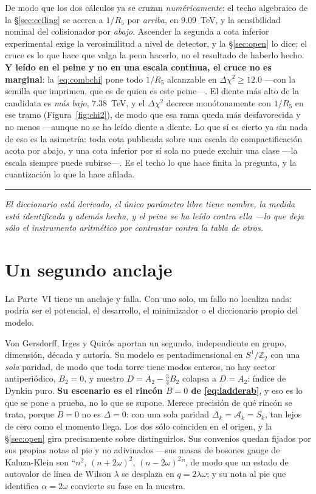 \documentclass[11pt,a4paper]{article}
\newcommand{\ZZ}{\mathbb{Z}}
\newcommand{\bridge}[1]{\par\medskip\noindent
  \textcolor{hdrblue!45}{\rule{2.2cm}{0.6pt}}\;\;\parbox[t]{0.84\textwidth}{\small\itshape
  \textcolor{hdrblue!85}{#1}}\par\medskip}
\newenvironment{keyeq}
  {\begin{center}\setlength{\fboxsep}{9pt}\setlength{\fboxrule}{0.8pt}%
   \begin{lrbox}{\keyeqbox}\begin{minipage}{0.88\textwidth}}
  {\end{minipage}\end{lrbox}%
   \fcolorbox{hdrblue!55}{hdrblue!6}{\usebox{\keyeqbox}}\end{center}}
\begin{document}
\begin{keyeq}
De modo que los dos cálculos ya se cruzan \emph{numéricamente}: el techo algebraico de la
\S\ref{sec:ceiling} se acerca a $1/R_5$ por \emph{arriba}, en $9.09$~TeV, y la sensibilidad nominal
del colisionador por \emph{abajo}. Ascender la segunda a cota inferior experimental exige la
verosimilitud a nivel de detector, y la \S\ref{sec:open} lo dice; el cruce es lo que hace que valga
la pena hacerlo, no el resultado de haberlo hecho. \textbf{Y leído en el peine y no en una escala
continua, el cruce no es marginal}: la \eqref{eq:combchi} pone todo $1/R_5$ alcanzable en
$\Delta\chi^2\ge12.0$ ---con la semilla que \cite{KM25} imprimen, que es de quien es este
peine---. El diente más alto de la candidata es \emph{más bajo}, $7.38$~TeV, y el $\Delta\chi^2$
decrece monótonamente con $1/R_5$ en ese tramo (Figura~\ref{fig:chi2}), de modo que esa rama
queda más desfavorecida y no menos ---aunque no se ha leído diente a diente. Lo que sí es cierto ya sin nada de eso es la asimetría:
toda cota publicada sobre una escala de compactificación acota por abajo, y una cota inferior por sí
sola no puede excluir una clase ---la escala siempre puede subirse---. Es el techo lo que hace
finita la pregunta, y la cuantización lo que la hace afilada.
\end{keyeq}

\bridge{El diccionario está derivado, el único parámetro libre tiene nombre, la medida está
identificada y además hecha, y el peine se ha leído contra ella ---lo que deja sólo el instrumento
aritmético por contrastar contra la tabla de otros.}

\section{Un segundo anclaje}\label{sec:anchor}

La Parte~VI tiene un anclaje y falla. Con uno solo, un fallo no localiza nada: podría ser el
potencial, el desarrollo, el minimizador o el diccionario propio del modelo.

Von Gersdorff, Irges y Quir\'os \cite{vGIQ} aportan un segundo, independiente en grupo, dimensión,
década y autoría. Su modelo es pentadimensional en $S^1/\ZZ_2$ con una \emph{sola} paridad, de modo
que toda torre tiene modos enteros, no hay sector antiperiódico, $B_2=0$, y nuestro
$D=A_2-\tfrac34B_2$ colapsa a $D=A_2$: índice de Dynkin puro. \textbf{Su escenario es el rincón
$B=0$ de \eqref{eq:ladderab}}, y eso es lo que se pone a prueba, no lo que se supone. Merece
precisión de qué rincón se trata, porque $B=0$ no es $\Delta=0$: con una sola paridad
$\Delta_k=\mathcal{A}_k=S_k$, tan lejos de cero como el momento llega. Los dos sólo coinciden en el origen, y
la \S\ref{sec:open} gira precisamente sobre distinguirlos. Sus
convenios quedan fijados por sus propias notas al pie y no adivinados ---sus masas de bosones gauge
de Kaluza-Klein son ``$n^2$, $(n+2\omega)^2$, $(n-2\omega)^2$'', de modo que un estado de autovalor
de línea de Wilson $\lambda$ se desplaza en $q=2\lambda\omega$; y su nota al pie que identifica
$\alpha=2\omega$ convierte su fase en la nuestra.
\end{document}
